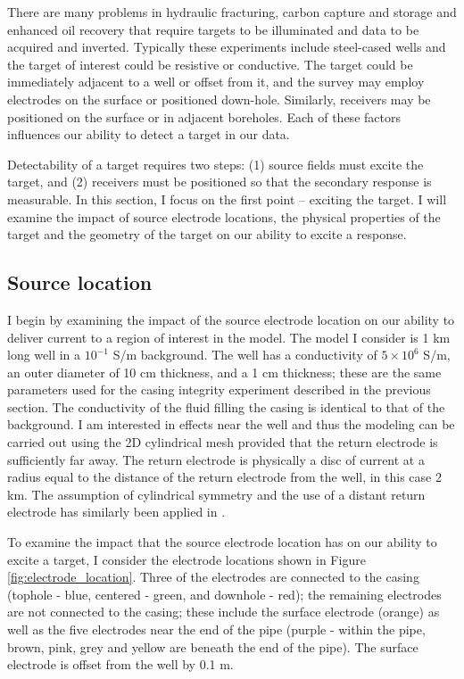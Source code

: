 There are many problems in hydraulic fracturing, carbon capture and storage and enhanced oil recovery that require targets to be illuminated and data to be acquired and inverted. Typically these experiments include steel-cased wells and the target of interest could be resistive or conductive. The target could be immediately adjacent to a well or offset from it, and the survey may employ electrodes on the surface or positioned down-hole. Similarly, receivers may be positioned on the surface or in adjacent boreholes. Each of these factors influences our ability to detect a target in our data.

Detectability of a target requires two steps: (1) source fields must excite the target, and (2) receivers must be positioned so that the secondary response is measurable. In this section, I focus on the first point -- exciting the target. I will examine the impact of source electrode locations, the physical properties of the target and the geometry of the target on our ability to excite a response.
\subsection{Source location}
I begin by examining the impact of the source electrode location on our ability to deliver current to a region of interest in the model. The model I consider is 1 km long well in a $10^{-1}$ S/m background. The well has a conductivity of $5 \times 10^6$ S/m, an outer diameter of 10 cm thickness, and a 1 cm thickness; these are the same parameters used for the casing integrity experiment described in the previous section. The conductivity of the fluid filling the casing is identical to that of the background. I am interested in effects near the well and thus the modeling can be carried out using the 2D cylindrical mesh provided that the return electrode is sufficiently far away. The return electrode is physically a disc of current at a radius equal to the distance of the return electrode from the well, in this case 2 km. The assumption of cylindrical symmetry and the use of a distant return electrode has similarly been applied in \cite{Schenkel1991}.

To examine the impact that the source electrode location has on our ability to excite a target, I consider the electrode locations shown in Figure \ref{fig:electrode_location}. Three of the electrodes are connected to the casing (tophole - blue, centered - green, and downhole - red); the remaining electrodes are not connected to the casing; these include the surface electrode (orange) as well as the five electrodes near the end of the pipe (purple - within the pipe, brown, pink, grey and yellow are beneath the end of the pipe). The surface electrode is offset from the well by 0.1 m.



